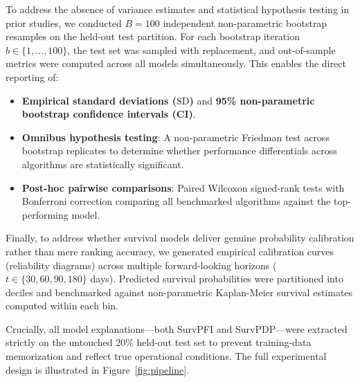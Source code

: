 \documentclass[pdflatex,iicol,sn-mathphys-ay]{sn-jnl}
\theoremstyle{thmstyleone}%
\theoremstyle{thmstyletwo}%
\theoremstyle{thmstylethree}%
\begin{document}
To address the absence of variance estimates and statistical hypothesis testing in prior studies, we conducted $B = 100$ independent non-parametric bootstrap resamples on the held-out test partition. For each bootstrap iteration $b \in \{1, \dots, 100\}$, the test set was sampled with replacement, and out-of-sample metrics were computed across all models simultaneously. This enables the direct reporting of:
\begin{itemize}
    \item \textbf{Empirical standard deviations ($\text{SD}$)} and \textbf{95\% non-parametric bootstrap confidence intervals (CI)}.
    \item \textbf{Omnibus hypothesis testing}: A non-parametric Friedman test across bootstrap replicates to determine whether performance differentials across algorithms are statistically significant.
    \item \textbf{Post-hoc pairwise comparisons}: Paired Wilcoxon signed-rank tests with Bonferroni correction comparing all benchmarked algorithms against the top-performing model.
\end{itemize}

Finally, to address whether survival models deliver genuine probability calibration rather than mere ranking accuracy, we generated empirical calibration curves (reliability diagrams) across multiple forward-looking horizons ($t \in \{30, 60, 90, 180\}$ days). Predicted survival probabilities were partitioned into deciles and benchmarked against non-parametric Kaplan-Meier survival estimates computed within each bin.

Crucially, all model explanations—both SurvPFI and SurvPDP—were extracted strictly on the untouched 20\% held-out test set to prevent training-data memorization and reflect true operational conditions. The full experimental design is illustrated in Figure~\ref{fig:pipeline}.
\end{document}
